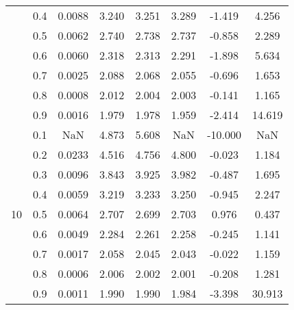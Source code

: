 \documentclass[11pt,a4paper]{report}
\begin{document}
\begin{longtable}{ | c | c || c | c | c | c | c | c | }
 & 0.4 & 0.0088 & 3.240 & 3.251 & 3.289 & -1.419 & 4.256 \\
 & 0.5 & 0.0062 & 2.740 & 2.738 & 2.737 & -0.858 & 2.289 \\
 & 0.6 & 0.0060 & 2.318 & 2.313 & 2.291 & -1.898 & 5.634 \\
 & 0.7 & 0.0025 & 2.088 & 2.068 & 2.055 & -0.696 & 1.653 \\
 & 0.8 & 0.0008 & 2.012 & 2.004 & 2.003 & -0.141 & 1.165 \\
 & 0.9 & 0.0016 & 1.979 & 1.978 & 1.959 & -2.414 & 14.619 \\
 \hline
\multirow{9}{*}{10} & 0.1 & NaN & 4.873 & 5.608 & NaN & -10.000 & NaN \\
 & 0.2 & 0.0233 & 4.516 & 4.756 & 4.800 & -0.023 & 1.184 \\
 & 0.3 & 0.0096 & 3.843 & 3.925 & 3.982 & -0.487 & 1.695 \\
 & 0.4 & 0.0059 & 3.219 & 3.233 & 3.250 & -0.945 & 2.247 \\
 & 0.5 & 0.0064 & 2.707 & 2.699 & 2.703 & 0.976 & 0.437 \\
 & 0.6 & 0.0049 & 2.284 & 2.261 & 2.258 & -0.245 & 1.141 \\
 & 0.7 & 0.0017 & 2.058 & 2.045 & 2.043 & -0.022 & 1.159 \\
 & 0.8 & 0.0006 & 2.006 & 2.002 & 2.001 & -0.208 & 1.281 \\
 & 0.9 & 0.0011 & 1.990 & 1.990 & 1.984 & -3.398 & 30.913 \\
 \hline
\hline
\end{longtable}
\end{document}
